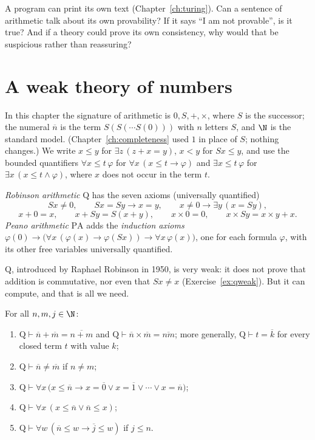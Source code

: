 \begin{think}
A program can print its own text (Chapter~\ref{ch:turing}). Can a sentence of arithmetic talk about its own provability? If it says ``I am not provable'', is it true? And if a theory could prove its own consistency, why would that be suspicious rather than reassuring?
\end{think}

\section{A weak theory of numbers}\label{sec:robinson}

In this chapter the signature of arithmetic is $0,S,+,\times$, where $S$ is the successor; the numeral $\overline n$ is the term $S(S(\cdots S(0)))$ with $n$ letters $S$, and $\N$ is the standard model. (Chapter~\ref{ch:completeness} used $1$ in place of $S$; nothing changes.) We write $x\le y$ for $\exists z\,(z+x=y)$, $x<y$ for $Sx\le y$, and use the bounded quantifiers $\forall x\le t\,\varphi$ for $\forall x\,(x\le t\to\varphi)$ and $\exists x\le t\,\varphi$ for $\exists x\,(x\le t\land\varphi)$, where $x$ does not occur in the term $t$.

\begin{definition}\label{def:robinsonq}
\emph{Robinson arithmetic} $\mathrm Q$ has the seven axioms (universally quantified)
\[
Sx\ne0,\qquad Sx=Sy\to x=y,\qquad x\ne0\to\exists y\,(x=Sy),
\]
\[
x+0=x,\qquad x+Sy=S(x+y),\qquad x\times0=0,\qquad x\times Sy=x\times y+x.
\]
\emph{Peano arithmetic} $\mathrm{PA}$ adds the \emph{induction axioms} $\varphi(0)\to\bigl(\forall x\,(\varphi(x)\to\varphi(Sx))\to\forall x\,\varphi(x)\bigr)$, one for each formula $\varphi$, with its other free variables universally quantified.
\end{definition}

$\mathrm Q$, introduced by Raphael Robinson in 1950, is very weak: it does not prove that addition is commutative, nor even that $Sx\ne x$ (Exercise~\ref{ex:qweak}). But it can compute, and that is all we need.

\begin{lemma}\label{lem:qfacts}
For all $n,m,j\in\N$:
\begin{enumerate}
\item $\mathrm Q\vdash\overline n+\overline m=\overline{n+m}$ and $\mathrm Q\vdash\overline n\times\overline m=\overline{nm}$; more generally, $\mathrm Q\vdash t=\overline{k}$ for every closed term $t$ with value $k$;
\item $\mathrm Q\vdash\overline n\ne\overline m$ if $n\ne m$;
\item $\mathrm Q\vdash\forall x\,\bigl(x\le\overline n\to x=\overline0\lor x=\overline1\lor\cdots\lor x=\overline n\bigr)$;
\item $\mathrm Q\vdash\forall x\,(x\le\overline n\lor\overline n\le x)$;
\item $\mathrm Q\vdash\forall w\,(\overline n\le w\to\overline j\le w)$ if $j\le n$.
\end{enumerate}
\end{lemma}

